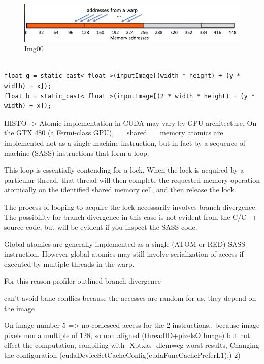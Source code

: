 \documentclass[a4paper]{article}
\begin{document}
\begin{figure}[!ht]
    \centering
    \includegraphics[width=0.7\linewidth]{profiling/darker/unaligned_load}
    \caption{Img00}
    \label{fig:unlo}
\end{figure}
\FloatBarrier

\begin{lstlisting}[label=loop, caption=Unaligned accesses]

float g = static_cast< float >(inputImage[(width * height) + (y * width) + x]);
float b = static_cast< float >(inputImage[(2 * width * height) + (y * width) + x]);

\end{lstlisting}
\FloatBarrier

 



HISTO -> Atomic implementation in CUDA may vary by GPU architecture. On the GTX 480 (a Fermi-class GPU), \_\_shared\_\_ memory atomics are implemented not as a single machine instruction, but in fact by a sequence of machine (SASS) instructions that form a loop.

This loop is essentially contending for a lock. When the lock is acquired by a particular thread, that thread will then complete the requested memory operation atomically on the identified shared memory cell, and then release the lock.

The process of looping to acquire the lock necessarily involves branch divergence. The possibility for branch divergence in this case is not evident from the C/C++ source code, but will be evident if you inspect the SASS code.

Global atomics are generally implemented as a single (ATOM or RED) SASS instruction. However global atomics may still involve serialization of access if executed by multiple threads in the warp. 

For this reason profiler outlined branch divergence

can't avoid banc conflics because the accesses are random for us, they depend on the image


On image number 5 => no coalesced access for the 2 instructions.. because image pixels non a multiple of 128, so non aligned (threadID+pizelsOfImage) but not effect the computation, compiling with -Xptxas -dlcm=cg worst results, Changing the configuration (cudaDeviceSetCacheConfig(cudaFuncCachePreferL1);)
2) 
\end{document}
